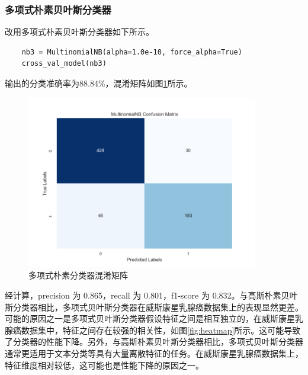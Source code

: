 \documentclass[a4paper,12pt,onecolumn,oneside]{article}
\begin{document}
\subsubsection{多项式朴素贝叶斯分类器}\label{6.2.2}
改用多项式朴素贝叶斯分类器如下所示。
\lstset{language=Python}
\lstset{frame=lines}
\lstset{basicstyle=\footnotesize}
\begin{lstlisting}
	nb3 = MultinomialNB(alpha=1.0e-10, force_alpha=True)
	cross_val_model(nb3)
\end{lstlisting}
输出的分类准确率为88.84\%，混淆矩阵如图\ref{fig:multinb}所示。\par 
\begin{figure}[h]
	\centering
	\includegraphics[width=0.9\textwidth]{res3/multinomialnb.png}
	\caption{多项式朴素分类器混淆矩阵}
	\label{fig:multinb}
\end{figure}
经计算，precision 为 0.865，recall 为 0.801，f1-score 为 0.832。与高斯朴素贝叶斯分类器相比，多项式贝叶斯分类器在威斯康星乳腺癌数据集上的表现显然更差。可能的原因之一是多项式贝叶斯分类器假设特征之间是相互独立的，在威斯康星乳腺癌数据集中，特征之间存在较强的相关性，如图\ref{fig:heatmap}所示。这可能导致了分类器的性能下降。另外，与高斯朴素贝叶斯分类器相比，多项式贝叶斯分类器通常更适用于文本分类等具有大量离散特征的任务。在威斯康星乳腺癌数据集上，特征维度相对较低，这可能也是性能下降的原因之一。
\end{document}
